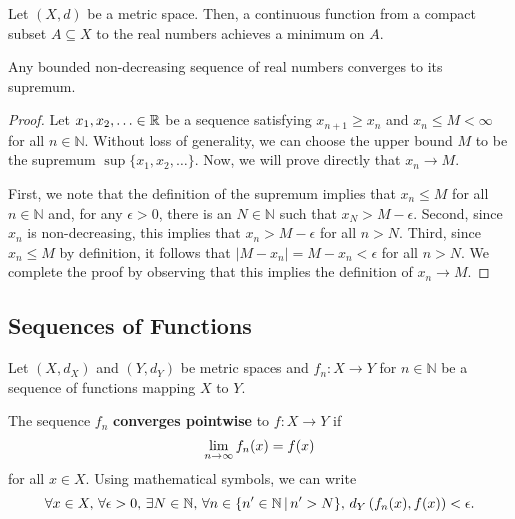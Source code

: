 \begin{corollary}
Let $(X,d)$ be a metric space.
Then, a continuous function from a compact subset $A\subseteq X$ to the real numbers achieves a minimum on $A$.
\end{corollary}

\begin{theorem}
Any bounded non-decreasing sequence of real numbers converges to its supremum.
\end{theorem}
\begin{proof}
Let $x_1,x_2,\ldots \in \mathbb{R}$ be a sequence satisfying $x_{n+1} \geq x_n$ and $x_n \leq M < \infty$ for all $n\in \mathbb{N}$.
Without loss of generality, we can choose the upper bound $M$ to be the supremum $\sup \{x_1,x_2,\ldots\}$.
Now, we will prove directly that $x_n \to M$.

First, we note that the definition of the supremum implies that $x_n \leq M$ for all $n\in \mathbb{N}$ and, for any $\epsilon >0$, there is an $N\in \mathbb{N}$ such that $x_N > M-\epsilon$.
Second, since $x_n$ is non-decreasing, this implies that $x_n > M-\epsilon$ for all $n>N$.
Third, since $x_n \leq M$ by definition, it follows that $|M - x_n| = M-x_n < \epsilon$ for all $n>N$.
We complete the proof by observing that this implies the definition of $x_n \to M$.
\end{proof}


\subsection{Sequences of Functions}

Let $(X,d_X)$ and $(Y,d_Y)$ be metric spaces and
$f_n \colon X \to Y$ for $n\in \mathbb{N}$ be a sequence of functions mapping $X$ to $Y$.

\begin{definition}
The sequence $f_n$ \textbf{converges pointwise} to $f\colon X \to Y$ if \vspace{-1mm}
\[ \lim_{n\to \infty} f_n (x) = f(x) \vspace*{-1mm} \]
for all $x \in X$.
Using mathematical symbols, we can write \vspace{-1mm}
\[ \forall x\in X, \, \forall \epsilon > 0, \, \exists N\in \mathbb{N}, \, \forall n \in \{ n' \in \mathbb{N}\,|\, n'>N \}, \, d_Y \left( f_n(x),f(x) \right) < \epsilon. \vspace*{-1mm} \]
\end{definition}

